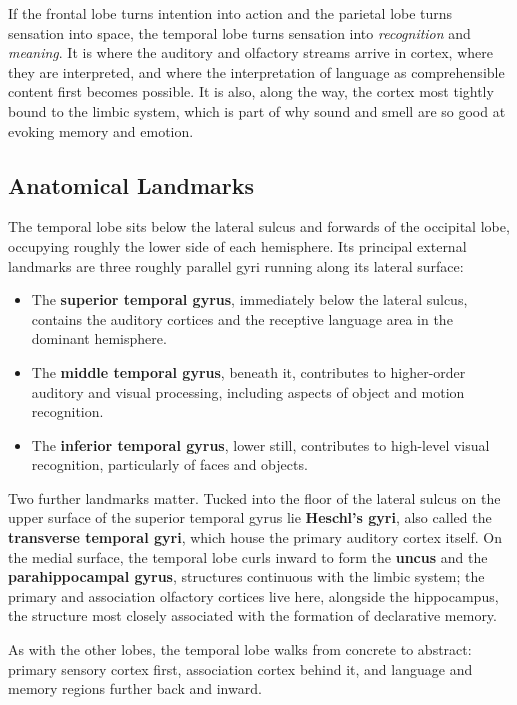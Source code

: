 \documentclass[11pt]{article}
\begin{document}
If the frontal lobe turns intention into action and the parietal lobe turns sensation into space, the temporal lobe turns sensation into \textit{recognition} and \textit{meaning}. It is where the auditory and olfactory streams arrive in cortex, where they are interpreted, and where the interpretation of language as comprehensible content first becomes possible. It is also, along the way, the cortex most tightly bound to the limbic system, which is part of why sound and smell are so good at evoking memory and emotion.

\subsection{Anatomical Landmarks}

The temporal lobe sits below the lateral sulcus and forwards of the occipital lobe, occupying roughly the lower side of each hemisphere. Its principal external landmarks are three roughly parallel gyri running along its lateral surface:

\begin{itemize}
    \item The \textbf{superior temporal gyrus}, immediately below the lateral sulcus, contains the auditory cortices and the receptive language area in the dominant hemisphere.
    \item The \textbf{middle temporal gyrus}, beneath it, contributes to higher-order auditory and visual processing, including aspects of object and motion recognition.
    \item The \textbf{inferior temporal gyrus}, lower still, contributes to high-level visual recognition, particularly of faces and objects.
\end{itemize}

Two further landmarks matter. Tucked into the floor of the lateral sulcus on the upper surface of the superior temporal gyrus lie \textbf{Heschl's gyri}, also called the \textbf{transverse temporal gyri}, which house the primary auditory cortex itself. On the medial surface, the temporal lobe curls inward to form the \textbf{uncus} and the \textbf{parahippocampal gyrus}, structures continuous with the limbic system; the primary and association olfactory cortices live here, alongside the hippocampus, the structure most closely associated with the formation of declarative memory.

As with the other lobes, the temporal lobe walks from concrete to abstract: primary sensory cortex first, association cortex behind it, and language and memory regions further back and inward.
\end{document}
